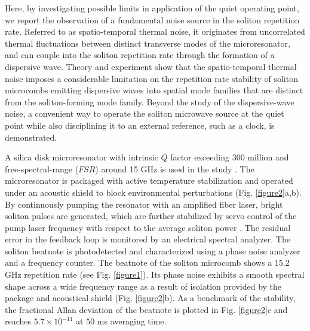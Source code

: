 \documentclass[noshowpacs,amsmath,
twocolumn,
superscriptaddress,
8pt,
aps,prb]{revtex4-2}
\begin{document}
Here, by investigating possible limits in application of the quiet operating point, we report the observation of a fundamental noise source in the soliton repetition rate. Referred to as spatio-temporal thermal noise, it originates from uncorrelated thermal fluctuations between distinct transverse modes of the microresonator, and can couple into the soliton repetition rate through the formation of a dispersive wave. Theory and experiment show that the spatio-temporal thermal noise imposes a considerable limitation on the repetition rate stability of soliton microcombs emitting dispersive waves into spatial mode families that are distinct from the soliton-forming mode family. Beyond the study of the dispersive-wave noise, a convenient way to operate the soliton microwave source at the quiet point while also disciplining it to an external reference, such as a clock, is demonstrated.

\medskip



\noindent A silica disk microresonator with intrinsic $Q$ factor exceeding $300$ million and free-spectral-range ($FSR$) around 15 GHz is used in the study \cite{lee2012chemically,wu2020greater}. The microresonator is packaged with active temperature stabilization \cite{suh2019directly} and operated under an acoustic shield to block environmental perturbations (Fig. \ref{figure2}a,b). By continuously pumping the resonator with an amplified fiber laser, bright soliton pulses are generated, which are further stabilized by servo control of the pump laser frequency with respect to the average soliton power \cite{yi2016active}. The residual error in the feedback loop is monitored by an electrical spectral analyzer. The soliton beatnote is photodetected and characterized using a phase noise analyzer and a frequency counter. The beatnote of the soliton microcomb shows a 15.2 GHz repetition rate (see Fig. \ref{figure1}). Its phase noise exhibits a smooth spectral shape across a wide frequency range as a result of isolation provided by the package and acoustical shield (Fig. \ref{figure2}b). As a benchmark of the stability, the fractional Allan deviation of the beatnote is plotted in Fig. \ref{figure2}c and reaches $5.7\times 10^{-11}$ at $50$ ms averaging time.





\medskip
{} 
\end{document}

